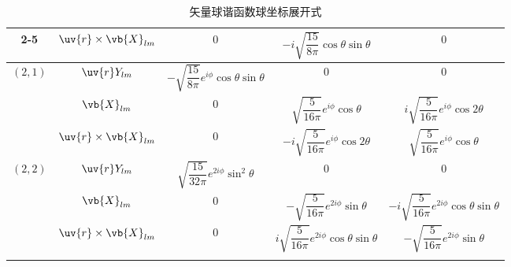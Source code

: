 \begin{longtable}{ccccc}
	\cmidrule(lr){2-5}
	          & \(\uv{r}\times\vb{X}_{lm}\) & \(0\)                                                     & \(-i\sqrt{\dfrac{15}{8\pi}}\cos\theta\sin\theta\)           & \(0\)                                                        \\
	\midrule
	\multirow{3}{*}{\((2,1)\)}
	          & \(\uv{r}Y_{lm}\)            & \(-\sqrt{\dfrac{15}{8\pi}}e^{i\phi}\cos\theta\sin\theta\) & \(0\)                                                       & \(0\)                                                        \\
	\cmidrule(lr){2-5}
	          & \(\vb{X}_{lm}\)             & \(0\)                                                     & \(\sqrt{\dfrac{5}{16\pi}}e^{i\phi}\cos\theta\)              & \(i\sqrt{\dfrac{5}{16\pi}}e^{i\phi}\cos2\theta\)             \\
	\cmidrule(lr){2-5}
	          & \(\uv{r}\times\vb{X}_{lm}\) & \(0\)                                                     & \(-i\sqrt{\dfrac{5}{16\pi}}e^{i\phi}\cos2\theta\)           & \(\sqrt{\dfrac{5}{16\pi}}e^{i\phi}\cos\theta\)               \\
	\midrule
	\multirow{3}{*}{\((2,2)\)}
	          & \(\uv{r}Y_{lm}\)            & \(\sqrt{\dfrac{15}{32\pi}}e^{2i\phi}\sin^2\theta\)        & \(0\)                                                       & \(0\)                                                        \\
	\cmidrule(lr){2-5}
	          & \(\vb{X}_{lm}\)             & \(0\)                                                     & \(-\sqrt{\dfrac{5}{16\pi}}e^{2i\phi}\sin\theta\)            & \(-i\sqrt{\dfrac{5}{16\pi}}e^{2i\phi}\cos\theta\sin\theta\)  \\
	\cmidrule(lr){2-5}
	          & \(\uv{r}\times\vb{X}_{lm}\) & \(0\)                                                     & \(i\sqrt{\dfrac{5}{16\pi}}e^{2i\phi}\cos\theta\sin\theta\)  & \(-\sqrt{\dfrac{5}{16\pi}}e^{2i\phi}\sin\theta\)             \\
	\bottomrule[1pt]
	\caption{矢量球谐函数球坐标展开式}
	\label{fig:vsh_spherical_expansion}
\end{longtable}
\endgroup